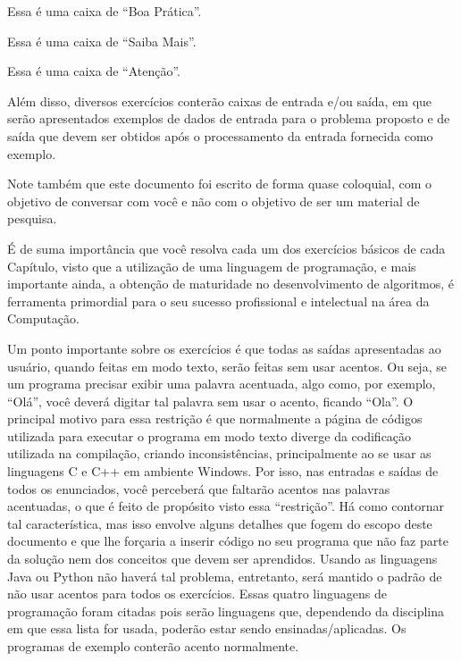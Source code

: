 \begin{boaPratica}
    Essa é uma caixa de ``Boa Prática''.
\end{boaPratica}

\begin{saibaMais}
    Essa é uma caixa de ``Saiba Mais''.
\end{saibaMais}

\begin{atencao}
    Essa é uma caixa de ``Atenção''.
\end{atencao}

Além disso, diversos exercícios conterão caixas de entrada e/ou saída, em que serão apresentados exemplos de dados de entrada para o problema proposto e de saída que devem ser obtidos após o processamento da entrada fornecida como exemplo.

Note também que este documento foi escrito de forma quase coloquial, com o objetivo de conversar com você e não com o objetivo de ser um material de pesquisa.

É de suma importância que você resolva cada um dos exercícios básicos de cada Capítulo, visto que a utilização de uma linguagem de programação, e mais importante ainda, a obtenção de maturidade no desenvolvimento de algoritmos, é ferramenta primordial para o seu sucesso profissional e intelectual na área da Computação.

Um ponto importante sobre os exercícios é que todas as saídas apresentadas ao usuário, quando feitas em modo texto, serão feitas sem usar acentos. Ou seja, se um programa precisar exibir uma palavra acentuada, algo como, por exemplo, ``Olá'', você deverá digitar tal palavra sem usar o acento, ficando ``Ola''. O principal motivo para essa restrição é que normalmente a página de códigos utilizada para executar o programa em modo texto diverge da codificação utilizada na compilação, criando inconsistências, principalmente ao se usar as linguagens C e C++ em ambiente Windows. Por isso, nas entradas e saídas de todos os enunciados, você perceberá que faltarão acentos nas palavras acentuadas, o que é feito de propósito visto essa ``restrição''. Há como contornar tal característica, mas isso envolve alguns detalhes que fogem do escopo deste documento e que lhe forçaria a inserir código no seu programa que não faz parte da solução nem dos conceitos que devem ser aprendidos. Usando as linguagens Java ou Python não haverá tal problema, entretanto, será mantido o padrão de não usar acentos para todos os exercícios. Essas quatro linguagens de programação foram citadas pois serão linguagens que, dependendo da disciplina em que essa lista for usada, poderão estar sendo ensinadas/aplicadas. Os programas de exemplo conterão acento normalmente.

